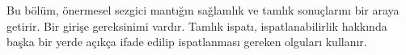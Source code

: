 


\begin{editorial}
  Bu bölüm, önermesel sezgici mantığın sağlamlık ve tamlık sonuçlarını bir
  araya getirir. Bir girişe gereksinimi vardır. Tamlık ispatı, ispatlanabilirlik
  hakkında başka bir yerde açıkça ifade edilip ispatlanması gereken olguları
  kullanır.
\end{editorial}


\OLEndChapterHook

